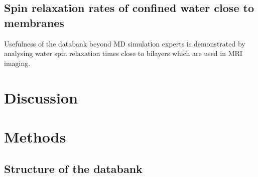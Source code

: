 \documentclass[fleqn,10pt]{wlscirep}
\begin{document}
\subsection{Spin relaxation rates of confined water close to membranes}

Usefulness of the databank beyond MD simulation experts is demonstrated by analysing water spin relaxation times close to bilayers which are used in MRI imaging.



 

\section{Discussion}


\section{Methods}


\subsection{Structure of the databank}
\end{document}
